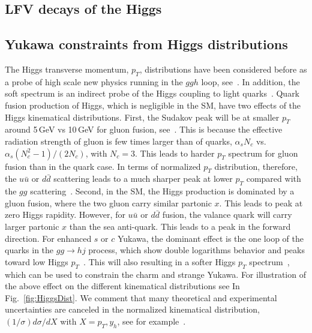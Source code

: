 \documentclass[../report.tex]{subfiles}
\begin{document}
\subsection{LFV decays of the Higgs}


\subsection{Yukawa constraints from Higgs distributions}

The Higgs transverse momentum, $p_T$, distributions have been considered before as a probe of high scale new physics running in the $ggh$ loop, see~\cite{Arnesen:2008fb,Biekotter:2016ecg,Brehmer:2015rna,Dawson:2015gka,Schlaffer:2014osa,Grojean:2013nya,Langenegger:2015lra,Bramante:2014hua,Buschmann:2014twa,Azatov:2013xha,Banfi:2013yoa,Buschmann:2014sia}. 
In addition, the soft spectrum is an indirect probe of the Higgs coupling to light quarks~\cite{Soreq:2016rae,Bishara:2016jga}. 
Quark fusion production of Higgs, which is negligible in the SM, have two effects of the Higgs kinematical distributions. 
%
First, the Sudakov peak will be at smaller $p_T$ around 5\,GeV vs 10\,GeV for gluon fusion, see~\cite{Collins:1984kg}. This is because the effective radiation strength of gluon is few times larger than of quarks, $\alpha_s N_c$ vs. $\alpha_s (N^2_c-1)/(2N_c)$, with $N_c=3$. This leads to harder $p_T$ spectrum for gluon fusion than in the quark case. 
In terms of normalized $p_T$ distribution, therefore, the $u\bar{u}$ or $d\bar{d}$ scattering leads to a much sharper peak at lower $p_T$ compared with the $gg$ scattering~\cite{Soreq:2016rae}.
Second, in the SM, the Higgs production is dominated by a gluon fusion, where the two gluon carry similar partonic $x$. This leads to peak at zero Higgs rapidity. However, for $u\bar u$ or $d\bar d$ fusion, the valance quark will carry larger partonic $x$ than the sea anti-quark. This leads to a peak in the forward direction. 
%
For enhanced $s$ or $c$ Yukawa, the dominant effect is the one loop of the quarks in the $gg\to hj$ process, which show double logarithms behavior and peaks toward low Higgs $p_T$~\cite{Baur:1989cm}. This will also resulting in a softer Higgs $p_T$ spectrum~\cite{Bishara:2016jga}, which can be used to constrain the charm and strange Yukawa. 
%
For illustration of the above effect on the different kinematical distributions see In Fig.~\ref{fig:HiggsDist}. 
We comment that many theoretical and experimental uncertainties are canceled in  the normalized kinematical distribution, $(1/\sigma)d\sigma/dX$ with $X=p_T, y_h$, see for example~\cite{Soreq:2016rae}.
\end{document}
